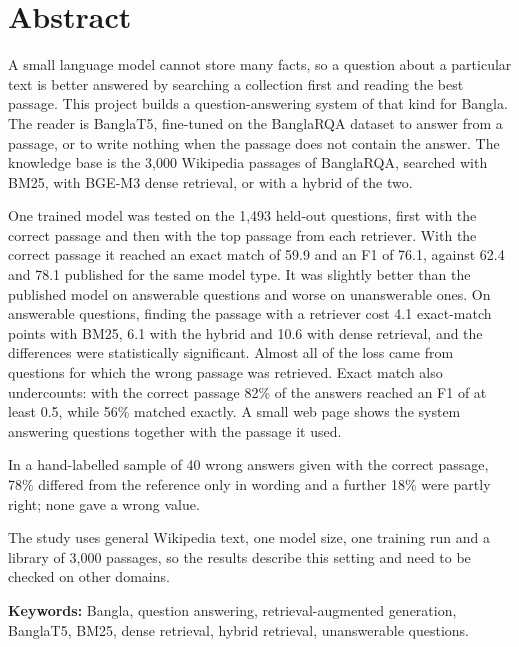 \chapter*{Abstract}
A small language model cannot store many facts, so a question about a particular text is better answered by searching a collection first and reading the best passage. This project builds a question-answering system of that kind for Bangla. The reader is BanglaT5, fine-tuned on the BanglaRQA dataset to answer from a passage, or to write nothing when the passage does not contain the answer. The knowledge base is the 3,000 Wikipedia passages of BanglaRQA, searched with BM25, with BGE-M3 dense retrieval, or with a hybrid of the two.

One trained model was tested on the 1,493 held-out questions, first with the correct passage and then with the top passage from each retriever. With the correct passage it reached an exact match of 59.9 and an F1 of 76.1, against 62.4 and 78.1 published for the same model type. It was slightly better than the published model on answerable questions and worse on unanswerable ones. On answerable questions, finding the passage with a retriever cost 4.1 exact-match points with BM25, 6.1 with the hybrid and 10.6 with dense retrieval, and the differences were statistically significant. Almost all of the loss came from questions for which the wrong passage was retrieved. Exact match also undercounts: with the correct passage 82\% of the answers reached an F1 of at least 0.5, while 56\% matched exactly. A small web page shows the system answering questions together with the passage it used.

In a hand-labelled sample of 40 wrong answers given with the correct passage, 78\% differed from the reference only in wording and a further 18\% were partly right; none gave a wrong value.

The study uses general Wikipedia text, one model size, one training run and a library of 3,000 passages, so the results describe this setting and need to be checked on other domains.

\medskip
\noindent\textbf{Keywords:} Bangla, question answering, retrieval-augmented generation, BanglaT5, BM25, dense retrieval, hybrid retrieval, unanswerable questions.
